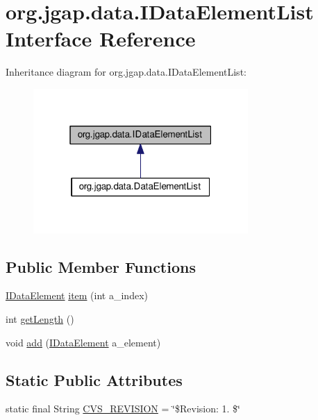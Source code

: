 \hypertarget{interfaceorg_1_1jgap_1_1data_1_1_i_data_element_list}{\section{org.\-jgap.\-data.\-I\-Data\-Element\-List Interface Reference}
\label{interfaceorg_1_1jgap_1_1data_1_1_i_data_element_list}
}


Inheritance diagram for org.\-jgap.\-data.\-I\-Data\-Element\-List\-:
\nopagebreak
\begin{figure}[H]
\begin{center}
\leavevmode
\includegraphics[width=232pt]{interfaceorg_1_1jgap_1_1data_1_1_i_data_element_list__inherit__graph}
\end{center}
\end{figure}
\subsection*{Public Member Functions}
\begin{DoxyCompactItemize}
\item 
\hyperlink{interfaceorg_1_1jgap_1_1data_1_1_i_data_element}{I\-Data\-Element} \hyperlink{interfaceorg_1_1jgap_1_1data_1_1_i_data_element_list_a54e7a8274019f512f4f4223143a96a33}{item} (int a\-\_\-index)
\item 
int \hyperlink{interfaceorg_1_1jgap_1_1data_1_1_i_data_element_list_aa9e2e115ba0dfd569a8b6fe9393c33d9}{get\-Length} ()
\item 
void \hyperlink{interfaceorg_1_1jgap_1_1data_1_1_i_data_element_list_a8cd420bff69254b397b33d8f6508d07a}{add} (\hyperlink{interfaceorg_1_1jgap_1_1data_1_1_i_data_element}{I\-Data\-Element} a\-\_\-element)
\end{DoxyCompactItemize}
\subsection*{Static Public Attributes}
\begin{DoxyCompactItemize}
\item 
static final String \hyperlink{interfaceorg_1_1jgap_1_1data_1_1_i_data_element_list_a686fda55c0dfc05c1761bd7cb2aeb3bd}{C\-V\-S\-\_\-\-R\-E\-V\-I\-S\-I\-O\-N} = \char`\"{}\$Revision\-: 1. \$\char`\"{}
\end{DoxyCompactItemize}


